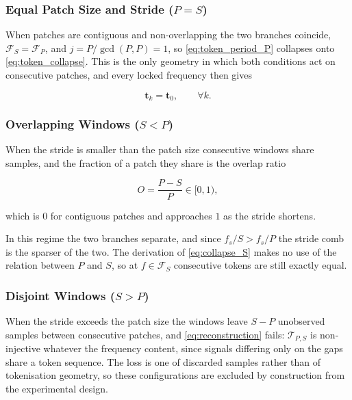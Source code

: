 \subsubsection*{Equal Patch Size and Stride ($P=S$)}
When patches are contiguous and non-overlapping the two branches coincide, $\mathcal{F}_{S}=\mathcal{F}_{P}$, and $j=P/\gcd(P,P)=1$, so \autoref{eq:token_period_P} collapses onto \autoref{eq:token_collapse}. This is the only geometry in which both conditions act on consecutive patches, and every locked frequency then gives

\begin{equation*}
\mathbf{t}_k
=
\mathbf{t}_0,
\qquad
\forall k.
\end{equation*}

\subsubsection*{Overlapping Windows ($S<P$)}
When the stride is smaller than the patch size consecutive windows share samples, and the fraction of a patch they share is the overlap ratio

\begin{equation}
\label{eq:overlap}
O
=
\frac{P-S}{P}
\in
\lbrack0,1\rparen,
\end{equation}

which is $0$ for contiguous patches and approaches $1$ as the stride shortens.

In this regime the two branches separate, and since $f_s/S>f_s/P$ the stride comb is the sparser of the two. The derivation of \autoref{eq:collapse_S} makes no use of the relation between $P$ and $S$, so at $f\in\mathcal{F}_{S}$ consecutive tokens are still exactly equal.

\subsubsection*{Disjoint Windows ($S>P$)}%
\label{sec:disjoint}
When the stride exceeds the patch size the windows leave $S-P$ unobserved samples between consecutive patches, and \autoref{eq:reconstruction} fails: $\mathcal{T}_{P,S}$ is non-injective whatever the frequency content, since signals differing only on the gaps share a token sequence. The loss is one of discarded samples rather than of tokenisation geometry, so these configurations are excluded by construction from the experimental design.

